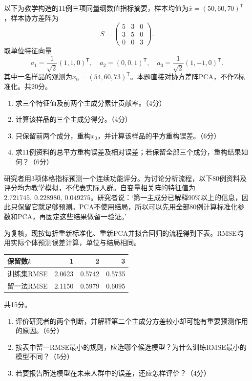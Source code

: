 以下为教学构造的11例三项同量纲数值指标摘要，样本均值为$\bar x=(50,60,70)^{\mathsf T}$，样本协方差阵为\[S=\begin{pmatrix}5&3&0\\3&5&0\\0&0&3\end{pmatrix}.\]取单位特征向量\[a_1=\frac1{\sqrt2}(1,1,0)^{\mathsf T},\quad a_2=(0,0,1)^{\mathsf T},\quad a_3=\frac1{\sqrt2}(1,-1,0)^{\mathsf T}.\]其中一名样品的观测为$x_0=(54,60,73)^{\mathsf T}$。本题直接对协方差阵PCA，不作Z标准化。共20分。\begin{enumerate}\item 求三个特征值及前两个主成分累计贡献率。（4分）\item 计算该样品的三个主成分得分。（4分）\item 只保留前两个成分，重构$x_0$，并计算该样品的平方重构误差。（6分）\item 求11例资料的总平方重构误差及相对误差；若保留全部三个成分，重构结果如何？（6分）\end{enumerate}

研究者用3项体格指标预测一个连续功能评分。为讨论分析流程，以下80例资料及评分均为教学模拟，不代表实际人群。自变量相关阵的特征值为$2.721745,\ 0.228980,\ 0.049275$。研究者说：‘第一主成分已解释90\%以上的信息，因此只保留它就足够预测。PCA不使用结局，所以可以先用全部80例计算标准化参数和PCA，再固定这些结果做留一验证。’\par 为复核，现按每折重新标准化、重新PCA并拟合回归的流程得到下表。RMSE均用实际个体预测误差计算，单位与结局相同。\begin{center}\small\begin{tabular}{lrrr}\toprule 保留数$k$&1&2&3\\\midrule 训练集RMSE&2.0623&0.5742&0.5735\\留一法RMSE&2.1150&0.5979&0.6095\\\bottomrule\end{tabular}\end{center}\noindent 共15分。\begin{enumerate}\item 评价研究者的两个判断，并解释第二个主成分方差较小却可能有重要预测作用的原因。（6分）\item 按表中留一RMSE最小的规则，应选哪个候选模型？为什么训练RMSE最小的模型不同？（5分）\item 若要报告所选模型在未来人群中的误差，还应怎样评价？（4分）\end{enumerate}
